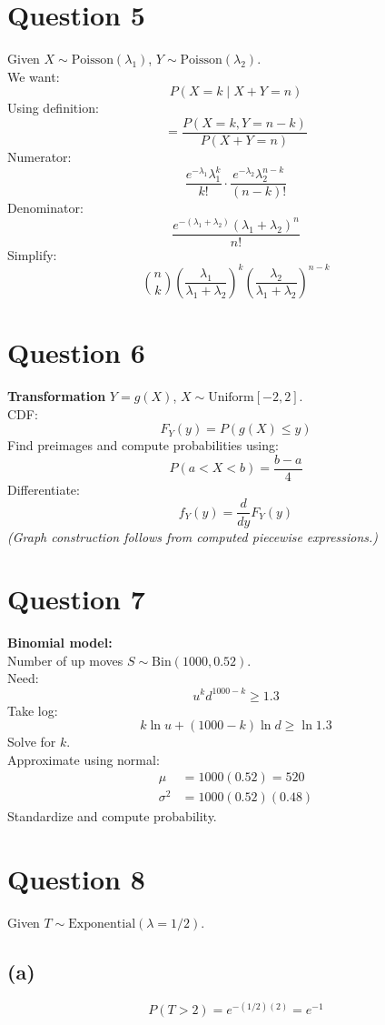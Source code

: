 \documentclass[11pt]{article}
\begin{document}
\section*{Question 5}
Given $X \sim \text{Poisson}(\lambda_1)$, $Y \sim \text{Poisson}(\lambda_2)$. \\
We want:
\[
P(X=k \mid X+Y=n)
\]
Using definition:
\[
= \frac{P(X=k,Y=n-k)}{P(X+Y=n)}
\]
Numerator:
\[
\frac{e^{-\lambda_1}\lambda_1^k}{k!} \cdot \frac{e^{-\lambda_2}\lambda_2^{n-k}}{(n-k)!}
\]
Denominator:
\[
\frac{e^{-(\lambda_1+\lambda_2)}(\lambda_1+\lambda_2)^n}{n!}
\]
Simplify:
\[
\binom{n}{k} \left(\frac{\lambda_1}{\lambda_1+\lambda_2}\right)^k \left(\frac{\lambda_2}{\lambda_1+\lambda_2}\right)^{n-k}
\]

\section*{Question 6}
\textbf{Transformation} $Y=g(X)$, $X \sim \text{Uniform}[-2,2]$. \\
CDF:
\[
F_Y(y) = P(g(X)\le y)
\]
Find preimages and compute probabilities using:
\[
P(a<X<b) = \frac{b-a}{4}
\]
Differentiate:
\[
f_Y(y) = \frac{d}{dy}F_Y(y)
\]
\textit{(Graph construction follows from computed piecewise expressions.)}

\section*{Question 7}
\textbf{Binomial model:} \\
Number of up moves $S \sim \text{Bin}(1000,0.52)$. \\
Need:
\[
u^k d^{1000-k} \ge 1.3
\]
Take log:
\[
k\ln u + (1000-k)\ln d \ge \ln 1.3
\]
Solve for $k$. \\
Approximate using normal:
\begin{align*}
\mu &= 1000(0.52) = 520 \\
\sigma^2 &= 1000(0.52)(0.48)
\end{align*}
Standardize and compute probability.

\section*{Question 8}
Given $T \sim \text{Exponential}(\lambda=1/2)$.

\subsection*{(a)}
\[
P(T>2) = e^{-(1/2)(2)} = e^{-1}
\]
\end{document}
